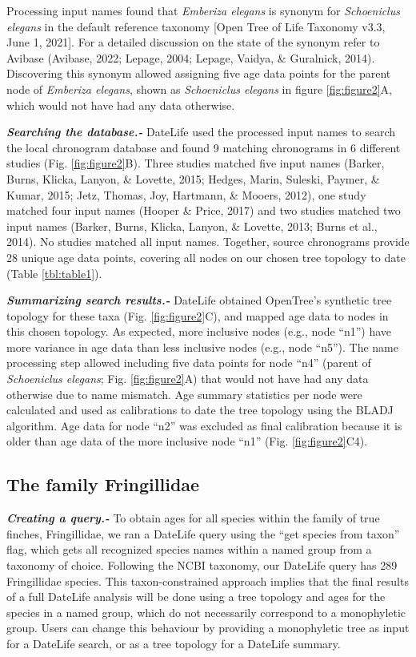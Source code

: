 \documentclass[
  english,
  man]{apa6}
\begin{document}
Processing input names found that \emph{Emberiza elegans} is synonym for \emph{Schoeniclus elegans} in the default reference taxonomy {[}Open Tree of Life Taxonomy v3.3, June 1, 2021{]}. For a detailed discussion on the state of the synonym refer to Avibase (Avibase, 2022; Lepage, 2004; Lepage, Vaidya, \& Guralnick, 2014).
Discovering this synonym allowed assigning five age data points for the parent node of \emph{Emberiza elegans}, shown as \emph{Schoeniclus elegans} in figure \ref{fig:figure2}A, which would not have had any data otherwise.

\emph{\textbf{Searching the database.-}}
DateLife used the processed input names to search the local chronogram database and found 9 matching chronograms in 6 different studies (Fig. \ref{fig:figure2}B). Three studies matched five input names (Barker, Burns, Klicka, Lanyon, \& Lovette, 2015; Hedges, Marin, Suleski, Paymer, \& Kumar, 2015; Jetz, Thomas, Joy, Hartmann, \& Mooers, 2012), one study matched four input names (Hooper \& Price, 2017) and two studies matched two input names (Barker, Burns, Klicka, Lanyon, \& Lovette, 2013; Burns et al., 2014). No studies matched all input names. Together, source chronograms provide 28 unique age data points, covering all nodes on our chosen tree topology to date (Table \ref{tbl:table1}).

\emph{\textbf{Summarizing search results.-}}
DateLife obtained OpenTree's synthetic tree topology for these taxa (Fig. \ref{fig:figure2}C), and mapped age data to nodes in this chosen topology.
As expected, more inclusive nodes (e.g., node ``n1'') have more variance in age data than less inclusive nodes (e.g., node ``n5'').
The name processing step allowed including five data points for node ``n4'' (parent of \emph{Schoeniclus elegans}; Fig. \ref{fig:figure2}A) that would not have had any data otherwise due to name mismatch.
Age summary statistics per node were calculated and used as calibrations to date the tree topology using the BLADJ algorithm.
Age data for node ``n2'' was excluded as final calibration because it is older than age data of the more inclusive node ``n1'' (Fig. \ref{fig:figure2}C4).

\hypertarget{the-family-fringillidae}{%
\subsection{The family Fringillidae}\label{the-family-fringillidae}}

\emph{\textbf{Creating a query.-}}
To obtain ages for all species within the family of true finches, Fringillidae, we ran a DateLife query using the ``get species from taxon'' flag,
which gets all recognized species names within a named group from a taxonomy of choice.
Following the NCBI taxonomy, our DateLife query has 289 Fringillidae species.
This taxon-constrained approach implies that the final results of a full DateLife analysis will be done using a tree topology and ages for the species in a named group, which do not necessarily correspond to a monophyletic group. Users can change this behaviour by providing a monophyletic tree as input for a DateLife search, or as a tree topology for a DateLife summary.
\end{document}
